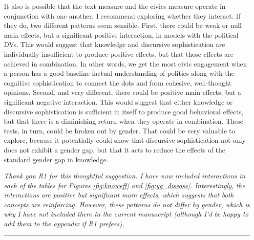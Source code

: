 It also is possible that the text measure and the civics measure operate in conjunction with one another. I recommend exploring whether they interact. If they do, two different patterns seem sensible. First, there could be weak or null main effects, but a significant positive interaction, in models with the political DVs. This would suggest that knowledge and discursive sophistication are individually insufficient to produce positive effects, but that those effects are achieved in combination. In other words, we get the most civic engagement when a person has a good baseline factual understanding of politics along with the cognitive sophistication to connect the dots and form cohesive, well-thought opinions. Second, and very different, there could be positive main effects, but a significant negative interaction. This would suggest that either knowledge or discursive sophistication is sufficient in itself to produce good behavioral effects, but that there is a diminishing
return when they operate in combination. These tests, in turn, could be broken out by gender. That could be very valuable to explore, because it potentially could show that discursive sophistication not only does not exhibit a gender gap, but that it acts to reduce the effects of the standard gender gap in knowledge.

\textit{Thank you R1 for this thoughtful suggestion. I have now included interactions in each of the tables for Figures \ref{fig:knoweff} and \ref{fig:yg_disease}. Interestingly, the interactions are positive but significant main effects, which suggests that both concepts are reinforcing. However, these patterns do not differ by gender, which is why I have not included them in the current manuscript (although I'd be happy to add them to the appendix if R1 prefers).}


\rule{\linewidth}{.01cm}

